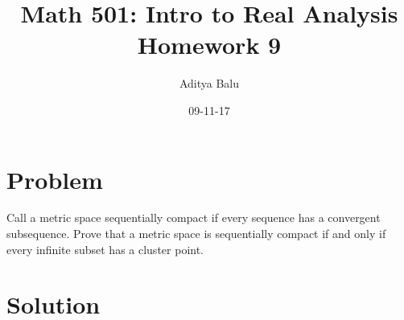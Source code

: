 \documentclass[]{article}
\title{Math 501: Intro to Real Analysis\\Homework 9}
\date{09-11-17}
\author{Aditya Balu}
\begin{document}
\maketitle

\section*{Problem}
Call a metric space sequentially compact if every sequence has a convergent subsequence. Prove that a metric space is sequentially compact if and only if every infinite subset has a cluster point.
\section*{Solution}
\end{document}
